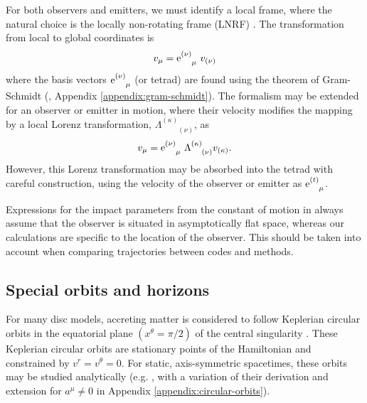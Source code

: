 For both observers and emitters, we must identify a local frame, where the natural choice is the locally non-rotating frame (LNRF) \citep{bardeen_rotating_1972} . The transformation from local to global coordinates is
\begin{equation}
    v_\mu = \text{e}^{(\nu)}_{\phantom{(\nu)}\mu}\  v_{(\nu)}
\end{equation}
where the basis vectors $\text{e}^{(\nu)}_{\phantom{(\nu)}\mu}$ (or tetrad) are found using the theorem of Gram-Schmidt (\citealp{schmidt_uber_1989}, Appendix \ref{appendix:gram-schmidt}). The formalism may be extended for an observer or emitter in motion, where their velocity modifies the mapping by a local Lorenz transformation, $\Lambda^{(\kappa)}_{\phantom{(\kappa)}(\nu)}$, as 
\begin{equation}
    v_\mu = \text{e}^{(\nu)}_{\phantom{(\nu)}\mu}\  \Lambda^{(\kappa)}_{\phantom{(a)}(\nu)} v_{(\kappa)}.
\end{equation}
However, this Lorenz transformation may be absorbed into the tetrad with careful construction, using the velocity of the observer or emitter as $\utensor{\e}{(t)}{\mu}$.

Expressions for the impact parameters from the constant of motion in \cite{cunningham_optical_1973} always assume that the observer is situated in asymptotically flat space, whereas our calculations are specific to the location of the observer. This should be taken into account when comparing trajectories between codes and methods.

\subsection{Special orbits and horizons}
\label{sec:special-orbits}

For many disc models, accreting matter is considered to follow Keplerian circular orbits in the equatorial plane $(x^\theta = \pi/2)$ of the central singularity \citep{shakura_black_1973}. These Keplerian circular orbits are stationary points of the Hamiltonian and constrained by $v^r = v^\theta = 0$. For static, axis-symmetric spacetimes, these orbits may be studied analytically (e.g. \citealp{johannsen_regular_2013}, with a variation of their derivation and extension for $a^\mu \neq 0$ in Appendix \ref{appendix:circular-orbits}).

